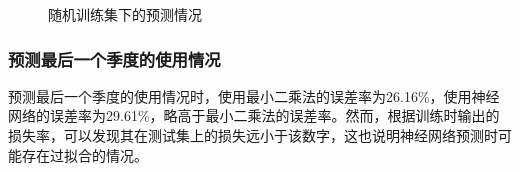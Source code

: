 \documentclass[CJK]{ctexart}
\begin{document}
\begin{figure}[htbp]
    \centering
    \centering
    \caption{随机训练集下的预测情况}
    \label{fig:loss_1}
\end{figure}
\subsubsection{预测最后一个季度的使用情况}
预测最后一个季度的使用情况时，使用最小二乘法的误差率为26.16\%，使用神经网络的误差率为29.61\%，略高于最小二乘法的误差率。然而，根据训练时输出的损失率，可以发现其在测试集上的损失远小于该数字，这也说明神经网络预测时可能存在过拟合的情况。
\end{document}
